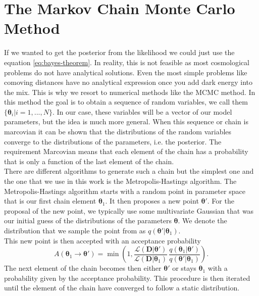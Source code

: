 \documentclass[../main.tex]{subfiles}
\begin{document}
\section{The Markov Chain Monte Carlo Method}
If we wanted to get the posterior from the likelihood we could just use the equation \ref{eq:bayes-theorem}. In reality, this is not feasible as most cosmological problems do not have analytical solutions. Even the most simple problems like comoving distances have no analytical expression once you add dark energy into the mix. This is why we resort to numerical methods like the MCMC method. In this method the goal is to obtain a sequence of random variables, we call them $\{\boldsymbol{\theta}_i|i=1,...,N\}$. In our case, these variables will be a vector of our model parameters, but the idea is much more general. When this sequence or chain is marcovian it can be shown that the distributions of the random variables converge to the distributions of the parameters, i.e. the posterior. The requirement Marcovian means that each element of the chain has a probability that is only a function of the last element of the chain.\\
There are different algorithms to generate such a chain but the simplest one and the one that we use in this work is the Metropolis-Hastings algorithm. The Metropolis-Hastings algorithm starts with a random point in parameter space that is our first chain element $\boldsymbol{\theta}_1$. It then proposes a new point $\boldsymbol{\theta}'$. For the proposal of the new point, we typically use some multivariate Gaussian that was our initial guess of the distributions of the parameters $\boldsymbol{\theta}$. We denote the distribution that we sample the point from as $q(\boldsymbol{\theta}'|\boldsymbol{\theta}_1)$.\\
This new point is then accepted with an acceptance probability \begin{equation}
    \label{eq:acceptance-rate}
    A(\boldsymbol{\theta}_1 \to \boldsymbol{\theta}') = \min\left(1,\frac{\mathcal{L}(\boldsymbol{D}|\boldsymbol{\theta}')}{\mathcal{L}(\boldsymbol{D}|\boldsymbol{\theta}_1)}\,\frac{q(\boldsymbol{\theta}_1|\boldsymbol{\theta}')}{q(\boldsymbol{\theta}'|\boldsymbol{\theta}_1)}\right).
\end{equation}
The next element of the chain becomes then either $\boldsymbol{\theta}'$ or stays $\boldsymbol{\theta}_1$ with a probability given by the acceptance probability. This procedure is then iterated until the element of the chain have converged to follow a static distribution.\\
\end{document}
